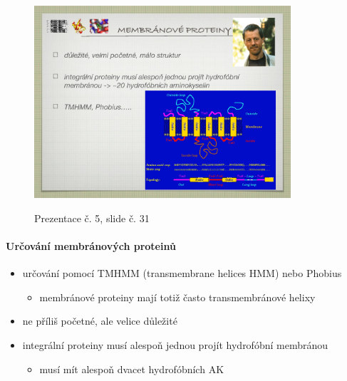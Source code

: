 \documentclass[DIV=8]{scrreprt}
\begin{document}
\begin{figure}
    \caption{Prezentace č. 5, slide č. 31}
    \includegraphics[width=0.85\textwidth]{slides-5/slide-31.jpg}
    \centering
    \label{slides-5-slide-31}
\end{figure}

\paragraph{Určování membránových proteinů}
\begin{itemize}[nosep]
    \item určování pomocí TMHMM (transmembrane helices HMM) nebo Phobius
\begin{itemize}[nosep]
    \item membránové proteiny mají totiž často transmembránové helixy
\end{itemize}

    \item ne příliš početné, ale velice důležité
    \item integrální proteiny musí alespoň jednou projít hydrofóbní membránou
\begin{itemize}[nosep]
    \item musí mít alespoň dvacet hydrofóbních AK
\end{itemize}

\end{itemize}
\end{document}
